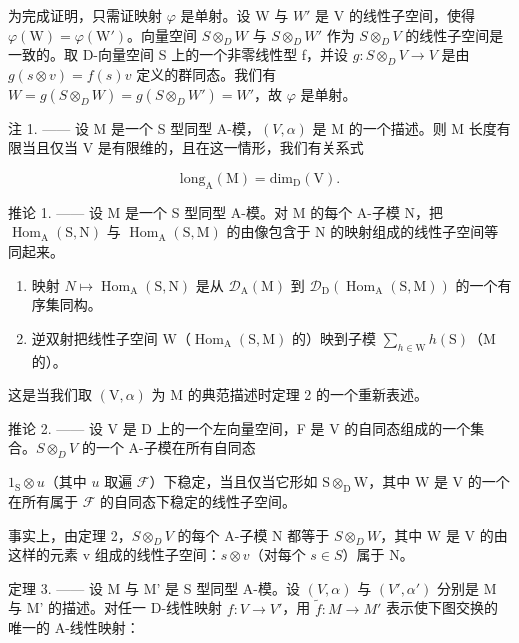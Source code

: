 为完成证明，只需证映射 \(\varphi\) 是单射。设 W 与 \(W'\) 是 V 的线性子空间，使得 \(\varphi(\mathrm{W}) = \varphi(\mathrm{W}')\)。向量空间 \(S \otimes_{D} W\) 与 \(S \otimes_{D} W'\) 作为 \(S \otimes_{D} V\) 的线性子空间是一致的。取 D-向量空间 S 上的一个非零线性型 f，并设 \(g : S \otimes_{D} V \to V\) 是由 \(g(s \otimes v) = f(s)v\) 定义的群同态。我们有 \(W = g(S \otimes_{D} W) = g(S \otimes_{D} W') = W'\)，故 \(\varphi\) 是单射。

注 1. —— 设 M 是一个 S 型同型 A-模，\((V, \alpha)\) 是 M 的一个描述。则 M 长度有限当且仅当 V 是有限维的，且在这一情形，我们有关系式

\[
\mathrm{long} _ {\mathrm{A}} (\mathrm{M}) = \mathrm{dim} _ {\mathrm{D}} (\mathrm{V}).
\]

推论 1. —— 设 M 是一个 S 型同型 A-模。对 M 的每个 A-子模 N，把 \(\operatorname{Hom}_{\mathrm{A}}(\mathrm{S},\mathrm{N})\) 与 \(\operatorname{Hom}_{\mathrm{A}}(\mathrm{S},\mathrm{M})\) 的由像包含于 N 的映射组成的线性子空间等同起来。

\begin{enumerate}
\def\labelenumi{\alph{enumi})}
\item
  映射 \(N \mapsto \operatorname{Hom}_{\mathrm{A}}(\mathrm{S}, \mathrm{N})\) 是从 \(\mathcal{D}_{\mathrm{A}}(\mathrm{M})\) 到 \(\mathcal{D}_{\mathrm{D}}(\operatorname{Hom}_{\mathrm{A}}(\mathrm{S}, \mathrm{M}))\) 的一个有序集同构。
\item
  逆双射把线性子空间 \(\mathrm{W}\)（\(\operatorname{Hom}_{\mathrm{A}}(\mathrm{S}, \mathrm{M})\) 的）映到子模 \(\sum_{h \in \mathrm{W}} h(\mathrm{S})\)（\(\mathrm{M}\) 的）。
\end{enumerate}

这是当我们取 \((\mathrm{V},\alpha)\) 为 M 的典范描述时定理 2 的一个重新表述。

推论 2. —— 设 V 是 D 上的一个左向量空间，F 是 V 的自同态组成的一个集合。\(S \otimes_{D} V\) 的一个 A-子模在所有自同态

\(1_{\mathrm{S}} \otimes u\)（其中 \(u\) 取遍 \(\mathcal{F}\)）下稳定，当且仅当它形如 \(\mathrm{S} \otimes_{\mathrm{D}} \mathrm{W}\)，其中 \(\mathrm{W}\) 是 \(\mathrm{V}\) 的一个在所有属于 \(\mathcal{F}\) 的自同态下稳定的线性子空间。

事实上，由定理 2，\(S \otimes_{D} V\) 的每个 A-子模 N 都等于 \(S \otimes_{D} W\)，其中 W 是 V 的由这样的元素 v 组成的线性子空间：\(s \otimes v\)（对每个 \(s \in S\)）属于 N。

定理 3. —— 设 M 与 M' 是 S 型同型 A-模。设 \((V, \alpha)\) 与 \((V', \alpha')\) 分别是 M 与 M' 的描述。对任一 D-线性映射 \(f : V \to V'\)，用 \(\widetilde{f} : M \to M'\) 表示使下图交换的唯一的 A-线性映射：

